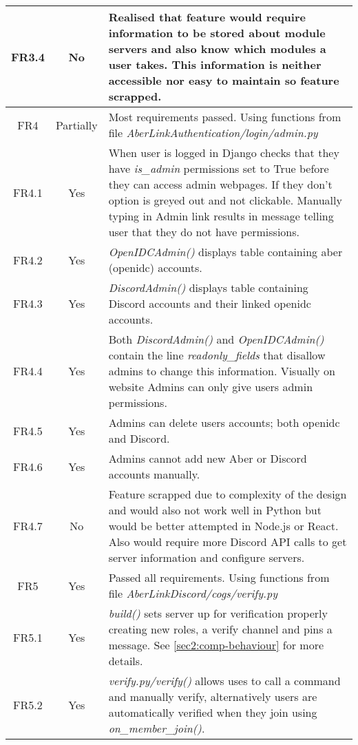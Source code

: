 \begin{longtable}{| c | c | p{10cm} |}
\hline
FR3.4 & \color{red}No & Realised that feature would require information to be stored about module servers and also know which modules a user takes. This information is neither accessible nor easy to maintain so feature scrapped.\\
\hline
FR4 & \color{orange}Partially & Most requirements passed. Using functions from file \textit{AberLinkAuthentication/login/admin.py}\\
\hline
FR4.1 & \color{ForestGreen}Yes & When user is logged in Django checks that they have \textit{is\_admin} permissions set to True before they can access admin webpages. If they don't option is greyed out and not clickable. Manually typing in Admin link results in message telling user that they do not have permissions.\\
\hline
FR4.2 & \color{ForestGreen}Yes & \textit{OpenIDCAdmin()} displays table containing aber (openidc) accounts.\\
\hline
FR4.3 & \color{ForestGreen}Yes & \textit{DiscordAdmin()} displays table containing Discord accounts and their linked openidc accounts.\\
\hline
FR4.4 & \color{ForestGreen}Yes & Both \textit{DiscordAdmin()} and \textit{OpenIDCAdmin()} contain the line \textit{readonly\_fields} that disallow admins to change this information. Visually on website Admins can only give users admin permissions.\\
\hline
FR4.5 & \color{ForestGreen}Yes & Admins can delete users accounts; both openidc and Discord.\\
\hline
FR4.6 & \color{ForestGreen}Yes & Admins cannot add new Aber or Discord accounts manually.\\
\hline
FR4.7 & \color{red}No & Feature scrapped due to complexity of the design and would also not work well in Python but would be better attempted in Node.js or React. Also would require more Discord API calls to get server information and configure servers.\\
\hline
FR5 & \color{ForestGreen}Yes & Passed all requirements. Using functions from file \textit{AberLinkDiscord/cogs/verify.py}\\
\hline
FR5.1 & \color{ForestGreen}Yes & \textit{build()} sets server up for verification properly creating new roles, a verify channel and pins a message. See \ref{sec2:comp-behaviour} for more details.\\
\hline
FR5.2 & \color{ForestGreen}Yes & \textit{verify.py/verify()} allows uses to call a command and manually verify, alternatively users are automatically verified when they join using \textit{on\_member\_join()}.\\

\end{longtable}
